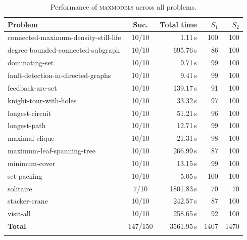 \begin{table}[htbp]
\centering
\caption{Performance of \textsc{maxmodels} across all problems.}
\label{tab:performance-maxmodels}
\begin{tabular}{lcrrr}
\toprule
Problem & Suc. & Total time & $S_1$ & $S_2$ \\
\midrule
connected-maximum-density-still-life & 10/10 & 1.11\,s & 100 & 100 \\
degree-bounded-connected-subgraph & 10/10 & 695.76\,s & 86 & 100 \\
dominating-set & 10/10 & 9.71\,s & 99 & 100 \\
fault-detection-in-directed-graphs & 10/10 & 9.41\,s & 99 & 100 \\
feedback-arc-set & 10/10 & 139.17\,s & 91 & 100 \\
knight-tour-with-holes & 10/10 & 33.32\,s & 97 & 100 \\
longest-circuit & 10/10 & 51.21\,s & 96 & 100 \\
longest-path & 10/10 & 12.71\,s & 99 & 100 \\
maximal-clique & 10/10 & 21.31\,s & 98 & 100 \\
maximum-leaf-spanning-tree & 10/10 & 266.99\,s & 87 & 100 \\
minimum-cover & 10/10 & 13.15\,s & 99 & 100 \\
set-packing & 10/10 & 5.05\,s & 100 & 100 \\
solitaire & 7/10 & 1801.83\,s & 70 & 70 \\
stacker-crane & 10/10 & 242.57\,s & 87 & 100 \\
visit-all & 10/10 & 258.65\,s & 92 & 100 \\
\midrule
\textbf{Total} & 147/150 & 3561.95\,s & 1407 & 1470 \\
\botrule
\end{tabular}
\end{table}

